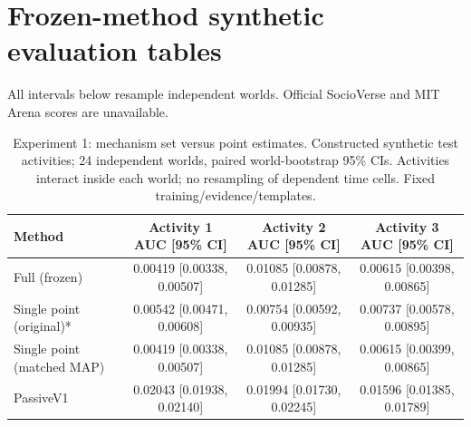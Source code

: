 \documentclass[10pt]{article}
\begin{document}
\section*{Frozen-method synthetic evaluation tables}
All intervals below resample independent worlds. Official SocioVerse and MIT Arena scores are unavailable.
\begin{table}[t]
\centering
\small
\caption{Experiment 1: mechanism set versus point estimates. Constructed synthetic test activities; 24 independent worlds, paired world-bootstrap 95\% CIs. Activities interact inside each world; no resampling of dependent time cells. Fixed training/evidence/templates.}
\begin{tabular}{lccc}
\toprule
Method & Activity 1 AUC [95\% CI] & Activity 2 AUC [95\% CI] & Activity 3 AUC [95\% CI] \\
\midrule
Full (frozen) & 0.00419 [0.00338, 0.00507] & 0.01085 [0.00878, 0.01285] & 0.00615 [0.00398, 0.00865] \\
Single point (original)* & 0.00542 [0.00471, 0.00608] & 0.00754 [0.00592, 0.00935] & 0.00737 [0.00578, 0.00895] \\
Single point (matched MAP) & 0.00419 [0.00338, 0.00507] & 0.01085 [0.00878, 0.01285] & 0.00615 [0.00399, 0.00865] \\
PassiveV1 & 0.02043 [0.01938, 0.02140] & 0.01994 [0.01730, 0.02245] & 0.01596 [0.01385, 0.01789] \\
\bottomrule
\end{tabular}
\end{table}
\end{document}
